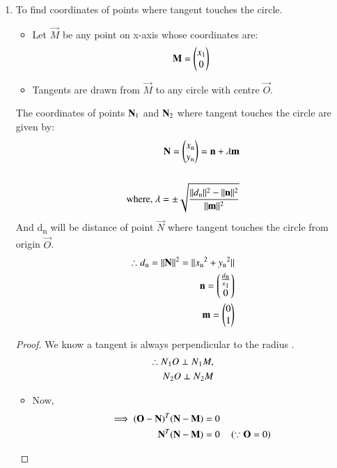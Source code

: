\documentclass[journal,12pt,twocolumn]{IEEEtran}
\begin{document}
\begin{enumerate}
    \item To find coordinates of points where tangent touches the circle.
\begin{itemize}
    \item Let $\vec{M}$ be any point on x-axis whose coordinates are:
    \begin{align}
    \vec{M} =\myvec{x\textsubscript{1} \\0} \label{eq1}
    \end{align}
    \item Tangents are drawn from $\vec{M}$ to any circle with centre $\vec{O}$.
\end{itemize}
\begin{lemma}
\label{lemma}
The coordinates of points $\vec{N\textsubscript{1}}$ and $\vec{N\textsubscript{2}}$ where tangent touches the circle are given by:
\begin{align}
\vec{N}=\myvec{x\textsubscript{n}\\y\textsubscript{n}}=\vec{n}+\lambda \vec{m} \label{eq2}
\\
\\
\text{where, }\lambda = \pm\sqrt{\frac{\norm{d\textsubscript{n}}^2-\norm{\vec{n}}^2}{\norm{\vec{m}}^2}}
\end{align}
And d\textsubscript{n} will be distance of point $\vec{N}$ where tangent touches the circle from origin $\vec{O}$.
\begin{align}
\therefore d\textsubscript{n}=\norm{\vec{N}}^2=\norm{x\textsubscript{n}^2+y\textsubscript{n}^2} 
\\
\vec{n}=\myvec{\frac{d\textsubscript{n}}{x\textsubscript{1}}\\0}
\\
\vec{m}=\myvec{0\\1} 
\end{align}
\end{lemma}
\begin{proof}
We know a tangent is always perpendicular to the radius .
\begin{align}
\therefore N\textsubscript{1}O \perp N\textsubscript{1}M, 
\\
N\textsubscript{2}O \perp N\textsubscript{2}M
\end{align}
\begin{itemize}
\item Now,
\begin{align}
 \implies (\vec{O}-\vec{N})^T (\vec{N}-\vec{M}) &= 0
 \\
 \vec{N}^T(\vec{N}-\vec{M})&= 0 \quad \brak{\because \vec{O}=0}

\end{align}
\end{itemize}
\end{proof}
\end{enumerate}
\end{document}
